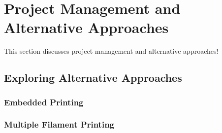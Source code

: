 \newpage
\section{Project Management and Alternative Approaches\label{methedology:pivoting}}
This section discusses project management and alternative approaches!



\subsection{Exploring Alternative Approaches\label{sec:methedology:pivoting:alternativeApproaches}}

\subsubsection{Embedded Printing\label{sec:methedology:pivoting:alternativeApproaches:embeddedPrinting}}

\subsubsection{Multiple Filament Printing\label{sec:methedology:pivoting:alternativeApproaches:multipleFilamentPrinting}}

